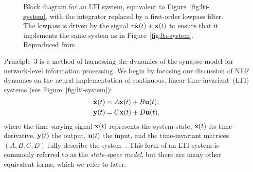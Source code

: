 \begin{figure}
{  
  }
  \caption{ \label{fig:lti-system-mapped}
    Block diagram for an LTI system, equivalent to Figure~\ref{fig:lti-system}, with the integrator replaced by a first-order lowpass filter.
    The lowpass is driven by the signal $\tau \dot{\mathbf{x}}(t) + \mathbf{x}(t)$ to ensure that it implements the same system as in Figure~\ref{fig:lti-system}.
    Reproduced from \citet[][Figure~2]{voelker2018}.
  }
\end{figure}

Principle~3 is a method of harnessing the dynamics of the synapse model for network-level information processing.
We begin by focusing our discussion of NEF dynamics on the neural implementation of continuous, linear time-invariant~(LTI) systems (see Figure~\ref{fig:lti-system}):
\begin{equation} \label{eq:lti}
\begin{split}
\dot{\mathbf{x}}(t) &= A\mathbf{x}(t) + B\mathbf{u}(t) \text{,} \\
\mathbf{y}(t) &= C\mathbf{x}(t) + D\mathbf{u}(t) \text{,}
\end{split}
\end{equation}
where the time-varying signal $\mathbf{x}(t)$ represents the system state, $\dot{\mathbf{x}}(t)$ its time-derivative, $\mathbf{y}(t)$ the output, $\mathbf{u}(t)$ the input, and the time-invariant matrices $(A\text{,}\, B\text{,}\, C\text{,}\, D)$ fully describe the system~\citep{brogan1982modern}.
This form of an LTI system is commonly referred to as the \emph{state-space model}, but there are many other equivalent forms, which we refer to later.


